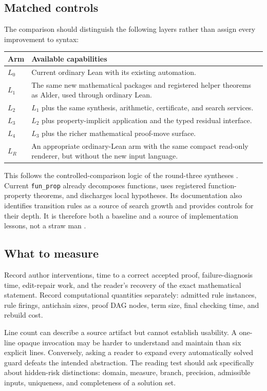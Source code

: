 \documentclass[11pt,a4paper]{article}
\newcommand{\code}[1]{\nolinkurl{#1}}
\theoremstyle{plain}
\theoremstyle{definition}
\theoremstyle{remark}
\begin{document}
\subsection{Matched controls}
The comparison should distinguish the following layers rather than assign every improvement to syntax:
\begin{center}\small
\begin{tabularx}{\textwidth}{@{}P{.12\textwidth}Y@{}}
\toprule Arm & Available capabilities\\\midrule
$L_0$ & Current ordinary Lean with its existing automation.\\
$L_1$ & The same new mathematical packages and registered helper theorems as Alder, used through ordinary Lean.\\
$L_2$ & $L_1$ plus the same synthesis, arithmetic, certificate, and search services.\\
$L_3$ & $L_2$ plus property-implicit application and the typed residual interface.\\
$L_4$ & $L_3$ plus the richer mathematical proof-move surface.\\
$L_R$ & An appropriate ordinary-Lean arm with the same compact read-only renderer, but without the new input language.\\
\bottomrule
\end{tabularx}
\end{center}
This follows the controlled-comparison logic of the round-three syntheses \cite{r3a,r3b}. Current \code{fun_prop} already decomposes functions, uses registered function-property theorems, and discharges local hypotheses. Its documentation also identifies transition rules as a source of search growth and provides controls for their depth. It is therefore both a baseline and a source of implementation lessons, not a straw man \cite{funprop}.

\subsection{What to measure}
Record author interventions, time to a correct accepted proof, failure-diagnosis time, edit-repair work, and the reader's recovery of the exact mathematical statement. Record computational quantities separately: admitted rule instances, rule firings, antichain sizes, proof DAG nodes, term size, final checking time, and rebuild cost.

Line count can describe a source artifact but cannot establish usability. A one-line opaque invocation may be harder to understand and maintain than six explicit lines. Conversely, asking a reader to expand every automatically solved guard defeats the intended abstraction. The reading test should ask specifically about hidden-risk distinctions: domain, measure, branch, precision, admissible inputs, uniqueness, and completeness of a solution set.
\end{document}
